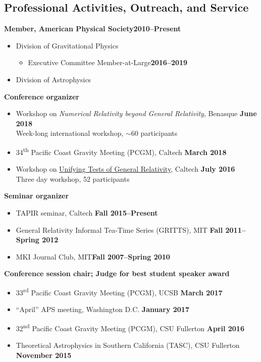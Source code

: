 \documentclass[margin,line]{res}
\begin{document}
\begin{resume}
\section{\sc Professional Activities, Outreach, and Service}
{\bf Member, American Physical Society}\hfill{\bf 2010--Present}\\
\begin{itemize}
\item[] Division of Gravitational Physics
  \begin{itemize}
  \item[] Executive Committee Member-at-Large\hfill{\bf 2016--2019}
  \end{itemize}
\item[] Division of Astrophysics
\end{itemize}
{\bf Conference organizer}
\vspace*{.05in}
\begin{itemize}
\item[] Workshop on \emph{Numerical Relativity beyond
    General Relativity},
  Benasque \hfill {\bf June 2018} \\
\hspace*{1em} Week-long international workshop, $\sim 60$ participants
\item[]
34\textsuperscript{th} Pacific Coast Gravity Meeting (PCGM),
Caltech
\hfill {\bf March 2018}
\item[] Workshop on \href{http://www.tapir.caltech.edu/~unifying-gr-tests/}{Unifying Tests of General Relativity},
  Caltech \hfill {\bf July 2016} \\
\hspace*{1em} Three day workshop, 52 participants
\end{itemize}
{\bf Seminar organizer}
\vspace*{.05in}
\begin{itemize}
\item[] TAPIR seminar, Caltech\hfill
  {\bf Fall 2015--Present}
\item[] General Relativity Informal Tea-Time Series (GRITTS), MIT\hfill
  {\bf Fall 2011--Spring 2012}
\item[] MKI Journal Club, MIT\hfill {\bf Fall 2007--Spring 2010}
\end{itemize}
{\bf Conference session chair; Judge for best student speaker award}
\vspace*{.05in}
\begin{itemize}
\item[]
33\textsuperscript{rd} Pacific Coast Gravity Meeting (PCGM),
UCSB
\hfill {\bf March 2017}
\item[]
``April'' APS meeting, Washington D.C.
\hfill {\bf January 2017}
\item[]
32\textsuperscript{nd} Pacific Coast Gravity Meeting (PCGM),
CSU Fullerton
\hfill {\bf April 2016}
\item[]
Theoretical Astrophysics in Southern California (TASC),
CSU Fullerton
\hfill {\bf November 2015}
\end{itemize}


\end{resume}
\end{document}
